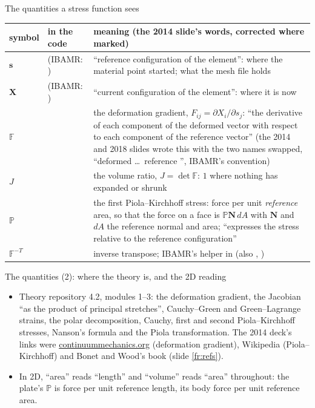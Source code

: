 \documentclass[aspectratio=169,11pt]{beamer}
\begin{document}
\begin{frame}{The quantities a stress function sees}
\label{fr:quantities}
\scriptsize
\begin{tabular}{@{}L{0.10\textwidth}L{0.26\textwidth}L{0.54\textwidth}@{}}
\toprule
symbol & in the code & meaning (the 2014 slide's words, corrected where marked) \\
\midrule
$\mathbf{s}$ &  (IBAMR: ) & ``reference configuration of the element'': where the material point started; what the mesh file holds \\
$\mathbf{X}$ &  (IBAMR: ) & ``current configuration of the element'': where it is now \\
$\mathbb{F}$ &  & the deformation gradient, $F_{ij} = \partial X_i/\partial s_j$: ``the derivative of each component of the deformed vector with respect to each component of the reference vector'' (the 2014 and 2018 slides wrote this with the two names swapped, ``deformed  \ldots\ reference '', IBAMR's convention) \\
$J$ &  & the volume ratio, $J = \det\mathbb{F}$: $1$ where nothing has expanded or shrunk \\
$\mathbb{P}$ &  & the first Piola--Kirchhoff stress: force per unit \emph{reference} area, so that the force on a face is $\mathbb{P}\mathbf{N}\,dA$ with $\mathbf{N}$ and $dA$ the reference normal and area; ``expresses the stress relative to the reference configuration'' \\
$\mathbb{F}^{-T}$ & \newline{} & inverse transpose; IBAMR's helper in  (also , ) \\
\bottomrule
\end{tabular}

\end{frame}

\begin{frame}{The quantities (2): where the theory is, and the 2D reading}
\label{fr:quantities2}
\footnotesize
\begin{itemize}
  \item Theory repository 4.2, modules 1--3: the deformation gradient, the Jacobian ``as the product of principal stretches'', Cauchy--Green and Green--Lagrange strains, the polar decomposition, Cauchy, first and second Piola--Kirchhoff stresses, Nanson's formula and the Piola transformation. The 2014 deck's links were \url{continuummechanics.org} (deformation gradient), Wikipedia (Piola--Kirchhoff) and Bonet and Wood's book (slide \ref{fr:refs}).
  \item In 2D, ``area'' reads ``length'' and ``volume'' reads ``area'' throughout: the plate's $\mathbb{P}$ is force per unit reference length, its body force per unit reference area.
\end{itemize}
\end{frame}
\end{document}
